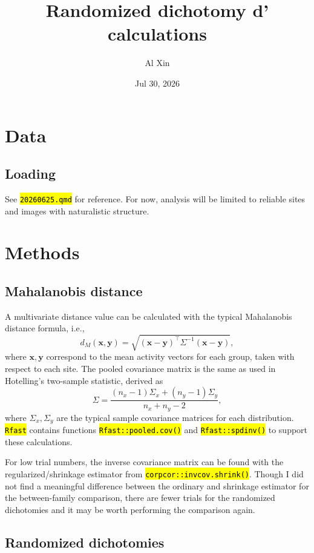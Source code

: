 \documentclass[
  10pt,
  letterpaper,
  DIV=11,
  numbers=noendperiod]{scrartcl}
\title{Randomized dichotomy d' calculations}
\author{\small Al Xin}
\date{Jul 30, 2026}
\let\OldTexttt\texttt
\renewcommand{\texttt}[1]{\OldTexttt{\hl{#1}}}
\begin{document}
\maketitle


\section{Data}\label{data}

\subsection{Loading}\label{loading}

See \texttt{20260625.qmd} for reference. For now, analysis will be
limited to reliable sites and images with naturalistic structure.

\section{Methods}\label{methods}

\subsection{Mahalanobis distance}\label{mahalanobis-distance}

A multivariate distance value can be calculated with the typical
Mahalanobis distance formula, i.e., \[
d_M (\mathbf{x}, \mathbf{y}) = \sqrt{(\mathbf{x} - \mathbf{y})^\intercal \Sigma^{-1} (\mathbf{x} - \mathbf{y})},
\] where \(\mathbf{x}, \mathbf{y}\) correspond to the mean activity
vectors for each group, taken with respect to each site. The pooled
covariance matrix is the same as used in Hotelling's two-sample
statistic, derived as \[
\Sigma = 
\frac{(n_x - 1) \Sigma_x + (n_y - 1)\Sigma_y}{n_x + n_y - 2},
\] where \(\Sigma_x, \Sigma_y\) are the typical sample covariance
matrices for each distribution. \texttt{Rfast} contains functions
\texttt{Rfast::pooled.cov()} and \texttt{Rfast::spdinv()} to support
these calculations.

For low trial numbers, the inverse covariance matrix can be found with
the regularized/shrinkage estimator from
\texttt{corpcor::invcov.shrink()}. Though I did not find a meaningful
difference between the ordinary and shrinkage estimator for the
between-family comparison, there are fewer trials for the randomized
dichotomies and it may be worth performing the comparison again.

\subsection{Randomized dichotomies}\label{randomized-dichotomies}
\end{document}
